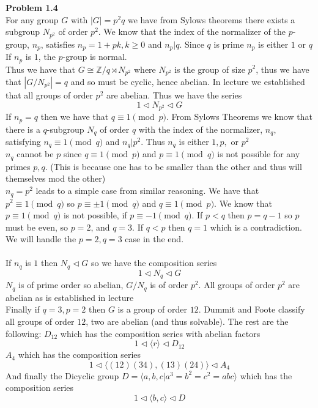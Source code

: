 \documentclass[12pt]{article}
\newenvironment{ques}[1]{\textbf{Problem #1}\vspace{1 mm}\\ }{\bigskip}
\theoremstyle{definition}
\newcommand{\Z}{\mathbb Z}
\begin{document}
\begin{ques}{1.4}
	For any group $G$ with $|G| = p^2q$ we have from Sylows theorems there
	exists a subgroup $N_{p^2}$ of order $p^2$. We know that the index of the
	normalizer of the $p$-group, $n_p$, satisfies $n_p = 1 + pk, k \geq 0$ and
	$n_p | q$. Since $q$ is prime $n_p$ is either $1$ or $q$ If $n_p$ is $1$,
	the $p$-group is normal.\\
	Thus we have that $G \cong \Z/q \rtimes N_{p^2}$ where $N_{p^2}$ is the group of
	size $p^2$, thus we have that $|G/N_{p^2}| = q$ and so must be cyclic,
	hence abelian. In lecture we established that all groups of order $p^2$
	are abelian. Thus we have the series
	$$1 \lhd N_{p^2} \lhd G$$
	If $n_p = q$ then we have that $q \equiv 1 \pmod p$.  From Sylows Theorems
	we know that there is a $q$-subgroup $N_q$ of order $q$ with the index of
	the normalizer, $n_q$, satisfying $n_q \equiv 1 \pmod q$ and $n_q | p^2$.
	Thus $n_q$ is either $1, p, $ or $p^2$\\
	$n_q$ cannot be $p$ since $q \equiv 1 \pmod p$ and $p \equiv 1 \pmod q$ is
	not possible for any primes $p, q$. (This is because one has to be smaller
	than the other and thus will themselves mod the other) \\
	$n_q = p^2$ leads to a simple case from similar reasoning. We have that
	$p^2 \equiv 1 \pmod q$ so $p \equiv \pm 1 \pmod q$ and $q \equiv 1 \pmod
	p$. We know that $p \equiv 1 \pmod q$ is not possible, if $p \equiv -1
	\pmod q$. If $p < q$ then $p = q - 1$ so $p$ must be even, so $p = 2$, and $q
	= 3$. If $q < p$ then $q = 1$ which is a contradiction. We will handle the
	$p = 2, q= 3$ case in the end.\\
	\\
	If $n_q$ is $1$ then $N_q \lhd G$ so we have the composition series
	$$1 \lhd N_q \lhd G$$
	$N_q$ is of prime order so abelian, $G/N_q$ is of order $p^2$. All
	groups of order $p^2$ are abelian as is established in lecture\\
	Finally if $q = 3, p = 2$ then $G$ is a group of order $12$. Dummit and
	Foote classify all groups of order $12$, two are abelian (and thus
	solvable). The rest are the following:
	$D_{12}$ which has the composition series with abelian factors 
	$$1 \lhd \langle r \rangle \lhd D_{12}$$
	$A_4$ which has the composition series 
	$$1 \lhd \langle(1 2)(3 4), (1 3)(2 4)\rangle \lhd A_4$$
	And finally the Dicyclic group $D = \langle a, b, c|a^3 = b^2 = c^2 =
	abc\rangle$ which has the composition series
	$$1 \lhd \langle b, c \rangle \lhd D$$
\end{ques}
\end{document}
